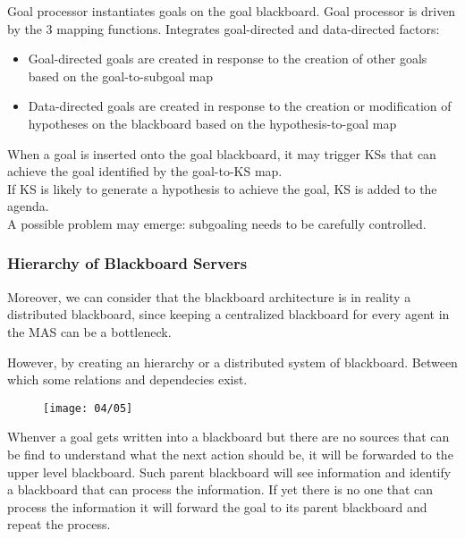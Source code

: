 Goal processor instantiates goals on the goal blackboard. Goal processor is driven by the 3 mapping functions. Integrates goal-directed and data-directed factors:
\begin{itemize}
\item Goal-directed goals are created in response to the creation of other goals based on the goal-to-subgoal map
\item Data-directed goals are created in response to the creation or modification of hypotheses on the blackboard based on the hypothesis-to-goal map
\end{itemize}

When a goal is inserted onto the goal blackboard, it may trigger KSs that can achieve the goal identified by the goal-to-KS map.\\
If KS is likely to generate a hypothesis to achieve the goal, KS is added to the agenda.\\
A possible problem may emerge: subgoaling needs to be carefully controlled.



\subsubsection{Hierarchy of Blackboard Servers}
Moreover, we can consider that the blackboard architecture is in reality a distributed blackboard, since keeping a centralized blackboard for every agent in the MAS can be a bottleneck.

However, by creating an hierarchy or a distributed system of blackboard. Between which some relations and dependecies exist.

\begin{figure}[!h]
\centering
\texttt{[image: 04/05]}
\end{figure}

Whenver a goal gets written into a blackboard but there are no sources that can be find to understand what the next action should be, it will be forwarded to the upper level blackboard.
Such parent blackboard will see information and identify a blackboard that can process the information.
If yet there is no one that can process the information it will forward the goal to its parent blackboard and repeat the process.

